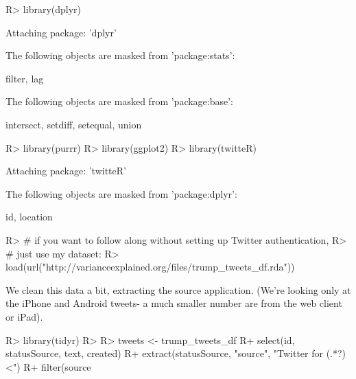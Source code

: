 \documentclass[
]{jss}
\begin{document}
\begin{CodeChunk}

\begin{CodeInput}
R> library(dplyr)
\end{CodeInput}

\begin{CodeOutput}

Attaching package: 'dplyr'
\end{CodeOutput}

\begin{CodeOutput}
The following objects are masked from 'package:stats':

    filter, lag
\end{CodeOutput}

\begin{CodeOutput}
The following objects are masked from 'package:base':

    intersect, setdiff, setequal, union
\end{CodeOutput}

\begin{CodeInput}
R> library(purrr)
R> library(ggplot2)
R> library(twitteR)
\end{CodeInput}

\begin{CodeOutput}

Attaching package: 'twitteR'
\end{CodeOutput}

\begin{CodeOutput}
The following objects are masked from 'package:dplyr':

    id, location
\end{CodeOutput}
\end{CodeChunk}

\begin{CodeChunk}

\begin{CodeInput}
R> # if you want to follow along without setting up Twitter authentication,
R> # just use my dataset:
R> load(url("http://varianceexplained.org/files/trump_tweets_df.rda"))
\end{CodeInput}
\end{CodeChunk}

We clean this data a bit, extracting the source application. (We're
looking only at the iPhone and Android tweets- a much smaller number are
from the web client or iPad).

\begin{CodeChunk}

\begin{CodeInput}
R> library(tidyr)
R> 
R> tweets <- trump_tweets_df %
R+   select(id, statusSource, text, created) %
R+   extract(statusSource, "source", "Twitter for (.*?)<") %
R+   filter(source %
\end{CodeInput}
\end{CodeChunk}
\end{document}

